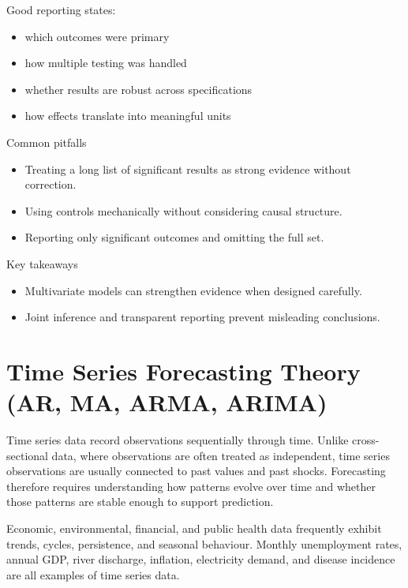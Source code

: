 \documentclass[
  11pt,
  oneside]{book}
\providecommand{\tightlist}{%
  \setlength{\itemsep}{0pt}\setlength{\parskip}{0pt}}
\begin{document}
Good reporting states:

\begin{itemize}
\tightlist
\item
  which outcomes were primary
\item
  how multiple testing was handled
\item
  whether results are robust across specifications
\item
  how effects translate into meaningful units
\end{itemize}

Common pitfalls

\begin{itemize}
\tightlist
\item
  Treating a long list of significant results as strong evidence without correction.
\item
  Using controls mechanically without considering causal structure.
\item
  Reporting only significant outcomes and omitting the full set.
\end{itemize}

Key takeaways

\begin{itemize}
\tightlist
\item
  Multivariate models can strengthen evidence when designed carefully.
\item
  Joint inference and transparent reporting prevent misleading conclusions.
\end{itemize}

\chapter{Time Series Forecasting Theory (AR, MA, ARMA, ARIMA)}\label{time-series}

Time series data record observations sequentially through time. Unlike cross-sectional data, where observations are often treated as independent, time series observations are usually connected to past values and past shocks. Forecasting therefore requires understanding how patterns evolve over time and whether those patterns are stable enough to support prediction.

Economic, environmental, financial, and public health data frequently exhibit trends, cycles, persistence, and seasonal behaviour. Monthly unemployment rates, annual GDP, river discharge, inflation, electricity demand, and disease incidence are all examples of time series data.
\end{document}
